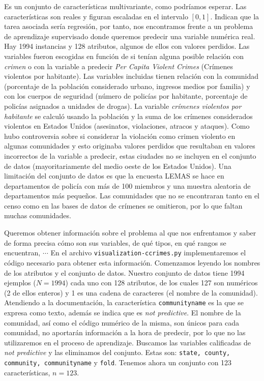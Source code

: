 \documentclass[a4paper, 20pt]{article}
\begin{document}
{Es un conjunto de características multivariante, como podríamos esperar. Las características son reales y figuran escaladas en el intervalo $[0,1]$. Indican que la tarea asociada sería regresión, por tanto, nos encontramos frente a un problema de aprendizaje supervisado donde queremos predecir una variable numérica real. Hay 1994 instancias y 128 atributos, algunos de ellos con valores perdidos. Las variables fueron escogidas en función de si tenían alguna posible relación con \textit{crimen} o con la variable a predecir \textit{Per Capita Violent Crimes} (Crímenes violentos por habitante). Las variables incluidas tienen relación con la comunidad (porcentaje de la población considerado urbano, ingresos medios por familia) y con los cuerpos de seguridad (número de policías por habitante, porcentaje de policías asignados a unidades de drogas). La variable \textit{crímenes violentos por habitante} se calculó usando la población y la suma de los crímenes considerados violentos en Estados Unidos (asesinatos, violaciones, atracos y ataques). Como hubo controversia sobre si considerar la violación como crimen violento en algunas comunidades y esto originaba valores perdidos que resultaban en valores incorrectos de la variable a predecir, estas ciudades no se incluyen en el conjunto de datos (mayoritariamente del medio oeste de los Estados Unidos). Una limitación del conjunto de datos es que la encuesta LEMAS se hace en departamentos de policía con más de 100 miembros y una muestra aleatoria de departamentos más pequeños. Las comunidades que no se encontraran tanto en el censo como en las bases de datos de crímenes se omitieron, por lo que faltan muchas comunidades.

Queremos obtener información sobre el problema al que nos enfrentamos y saber de forma precisa cómo son sus variables, de qué tipos, en qué rangos se encuentran, $\cdots$ En el archivo \texttt{visualization-ccrimes.py} implementaremos el código necesario para obtener esta información. Comenzamos leyendo los nombres de los atributos y el conjunto de datos. Nuestro conjunto de datos tiene 1994 ejemplos ($N = 1994$) cada uno con 128 atributos, de los cuales 127 son numéricos (2 de ellos enteros) y 1 es una cadena de caracteres (el nombre de la comunidad). Atendiendo a la documentación, la característica \texttt{communityname} es la que se expresa como texto, además se indica que es \textit{not predictive}. El nombre de la comunidad, así como el código numérico de la misma, son únicos para cada comunidad, no aportarán información a la hora de predecir, por lo que no las utilizaremos en el proceso de aprendizaje. Buscamos las variables calificadas de \textit{not predictive} y las eliminamos del conjunto. Estas son: \texttt{state, county, community, communityname} y \texttt{fold}. Tenemos ahora un conjunto con 123 características, $n=123$.

}
\end{document}
